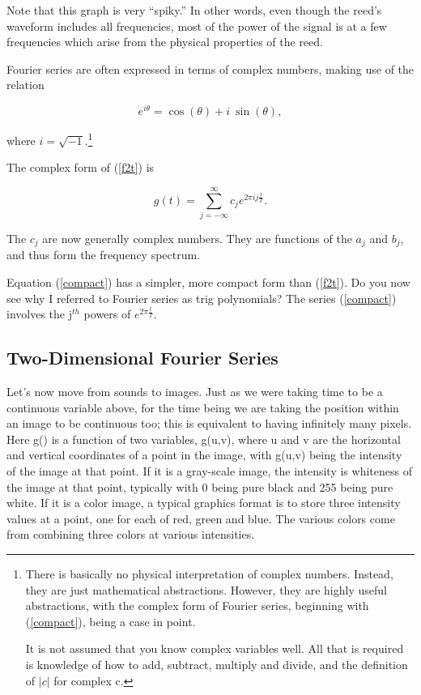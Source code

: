 Note that this graph is very {}``spiky.{}'' In other words, even though
the reed's waveform includes all frequencies, most of the power of the
signal is at a few frequencies which arise from the physical properties
of the reed.   

Fourier series are often expressed in terms of complex numbers, making
use of the relation

\begin{equation}
e^{i \theta} = \cos(\theta) + i ~ \sin(\theta),
\end{equation}

where $i = \sqrt{-1}$.\footnote{There is basically no physical
interpretation of complex numbers.  Instead, they are just
mathematical abstractions.  However, they are highly useful
abstractions, with the complex form of Fourier series, beginning with
(\ref{compact}), being a case in point.

It is not assumed that you know complex variables well.  All that is
required is knowledge of how to add, subtract, multiply and divide, and
the definition of $|c|$ for complex c.}  

The complex form of (\ref{f2t}) is

\begin{equation}
\label{compact}
g(t) = \sum_{j = -\infty}^{\infty} c_j e^{2\pi i j \frac{t}{T}}.
\end{equation}

The $c_j$ are now generally complex numbers.  They are functions of the
$a_j$ and $b_j$, and thus form the frequency spectrum.

Equation (\ref{compact}) has a simpler, more compact form than
(\ref{f2t}).  Do you now see why I referred to Fourier series as trig
polynomials?  The series (\ref{compact}) involves the j$^{th}$ powers of
$e^{2\pi \frac{t}{T} }$.

\subsection{Two-Dimensional Fourier Series}

Let's now move from sounds to images.  Just as we were taking time to be a
continuous variable above, for the time being we are taking the position
within an image to be continuous too; this is equivalent to having
infinitely many pixels.  Here g() is a function of two variables,
g(u,v), where u and v are the horizontal and vertical coordinates of a
point in the image, with g(u,v) being the intensity of the image at that
point.  If it is a gray-scale image, the intensity is whiteness of the
image at that point, typically with 0 being pure black and 255 being
pure white.  If it is a color image, a typical graphics format is to
store three intensity values at a point, one for each of red, green and
blue.  The various colors come from combining three colors at various
intensities.

